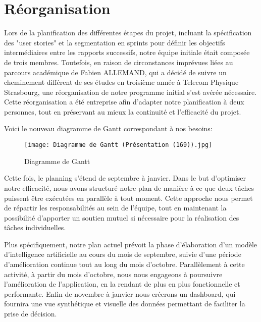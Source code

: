 \section{Réorganisation}

Lors de la planification des différentes étapes du projet, incluant la spécification des "user stories" et la segmentation en sprints pour définir les objectifs intermédiaires entre les rapports successifs, notre équipe initiale était composée de trois membres. Toutefois, en raison de circonstances imprévues liées au parcours académique de Fabien ALLEMAND, qui a décidé de suivre un cheminement différent de ses études en troisième année à Telecom Physique Strasbourg, une réorganisation de notre programme initial s'est avérée nécessaire. Cette réorganisation a été entreprise afin d'adapter notre planification à deux personnes, tout en préservant au mieux la continuité et l'efficacité du projet.

Voici le nouveau diagramme de Gantt correspondant à nos besoins: 
\begin{figure}[H]
    \centering
    \texttt{[image: Diagramme de Gantt (Présentation (169)).jpg]}
    \caption{Diagramme de Gantt}
    \label{gantt}
\end{figure}

Cette fois, le planning s'étend de septembre à janvier. Dans le but d'optimiser notre efficacité, nous avons structuré notre plan de manière à ce que deux tâches puissent être exécutées en parallèle à tout moment. Cette approche nous permet de répartir les responsabilités au sein de l'équipe, tout en maintenant la possibilité d'apporter un soutien mutuel si nécessaire pour la réalisation des tâches individuelles.

Plus spécifiquement, notre plan actuel prévoit la phase d'élaboration d'un modèle d'intelligence artificielle au cours du mois de septembre, suivie d'une période d'amélioration continue tout au long du mois d'octobre. Parallèlement à cette activité, à partir du mois d'octobre, nous nous engageons à poursuivre l'amélioration de l'application, en la rendant de plus en plus fonctionnelle et performante. Enfin de novembre à janvier nous créerons un dashboard, qui fournira une vue synthétique et visuelle des données permettant de faciliter la prise de décision.

